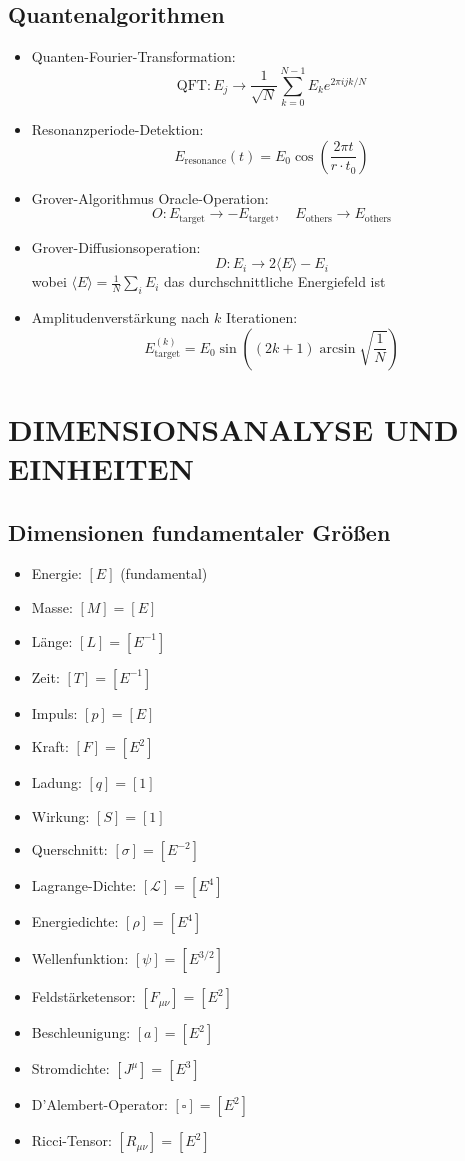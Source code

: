\documentclass[12pt,a4paper]{article}
\begin{document}
	\subsection{Quantenalgorithmen}
	\begin{itemize}
		\item Quanten-Fourier-Transformation:
		$$\text{QFT}: E_j \rightarrow \frac{1}{\sqrt{N}} \sum_{k=0}^{N-1} E_k e^{2\pi i jk/N}$$
		
		\item Resonanzperiode-Detektion:
		$$E_{\text{resonance}}(t) = E_0 \cos\left(\frac{2\pi t}{r \cdot t_0}\right)$$
		
		\item Grover-Algorithmus Oracle-Operation:
		$$O: E_{\text{target}} \rightarrow -E_{\text{target}}, \quad E_{\text{others}} \rightarrow E_{\text{others}}$$
		
		\item Grover-Diffusionsoperation:
		$$D: E_i \rightarrow 2\langle E \rangle - E_i$$
		wobei $\langle E \rangle = \frac{1}{N}\sum_i E_i$ das durchschnittliche Energiefeld ist
		
		\item Amplitudenverst\"{a}rkung nach $k$ Iterationen:
		$$E_{\text{target}}^{(k)} = E_0 \sin\left((2k+1)\arcsin\sqrt{\frac{1}{N}}\right)$$
	\end{itemize}
	

	\section{DIMENSIONSANALYSE UND EINHEITEN}
	
	\subsection{Dimensionen fundamentaler Gr\"{o}\ss{}en}
	\begin{itemize}
		\item Energie: $[E]$ (fundamental)
		\item Masse: $[M] = [E]$
		\item L\"{a}nge: $[L] = [E^{-1}]$
		\item Zeit: $[T] = [E^{-1}]$
		\item Impuls: $[p] = [E]$
		\item Kraft: $[F] = [E^2]$
		\item Ladung: $[q] = [1]$
		\item Wirkung: $[S] = [1]$
		\item Querschnitt: $[\sigma] = [E^{-2}]$
		\item Lagrange-Dichte: $[\mathcal{L}] = [E^4]$
		\item Energiedichte: $[\rho] = [E^4]$
		\item Wellenfunktion: $[\psi] = [E^{3/2}]$
		\item Feldst\"{a}rketensor: $[F_{\mu\nu}] = [E^2]$
		\item Beschleunigung: $[a] = [E^2]$
		\item Stromdichte: $[J^\mu] = [E^3]$
		\item D'Alembert-Operator: $[\square] = [E^2]$
		\item Ricci-Tensor: $[R_{\mu\nu}] = [E^2]$
	\end{itemize}
	
\end{document}
